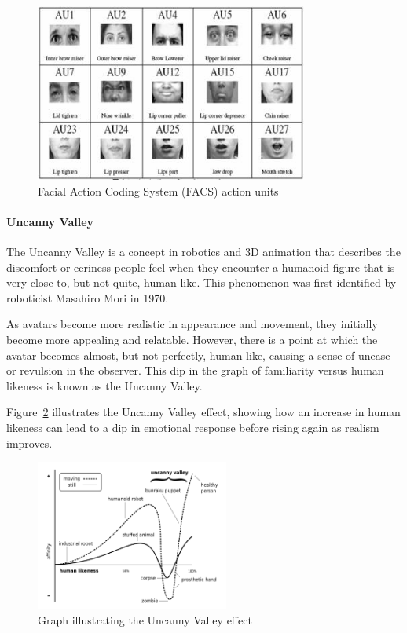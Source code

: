 \documentclass[../../main.tex]{subfiles}
\begin{document}
\begin{figure}
    \centering
    \includegraphics[width=0.8\textwidth]{chapters/facial_expressions/images/action_units.jpg}
    \caption{Facial Action Coding System (FACS) action units}
    \label{ch:facial_expressions:fig:action_units}
\end{figure}

\paragraph{Uncanny Valley}
\label{ch:background_work:sign_language_synthesis:3d_techniques:avatar_animation:uncanny_valley}

The Uncanny Valley is a concept in robotics and 3D animation that describes the discomfort or eeriness people feel when they encounter a humanoid figure that is very close to, but not quite, human-like. This phenomenon was first identified by roboticist Masahiro Mori in 1970.

As avatars become more realistic in appearance and movement, they initially become more appealing and relatable. However, there is a point at which the avatar becomes almost, but not perfectly, human-like, causing a sense of unease or revulsion in the observer. This dip in the graph of familiarity versus human likeness is known as the Uncanny Valley.

Figure~\ref{fig:uncanny_valley_graph} illustrates the Uncanny Valley effect, showing how an increase in human likeness can lead to a dip in emotional response before rising again as realism improves.

\begin{figure}
  \centering
  \includegraphics[width = 2.5in]{chapters/background_work/images/uncanny_valley_graph.png}
  \caption{Graph illustrating the Uncanny Valley effect}
  \label{fig:uncanny_valley_graph}
\end{figure}
\end{document}

